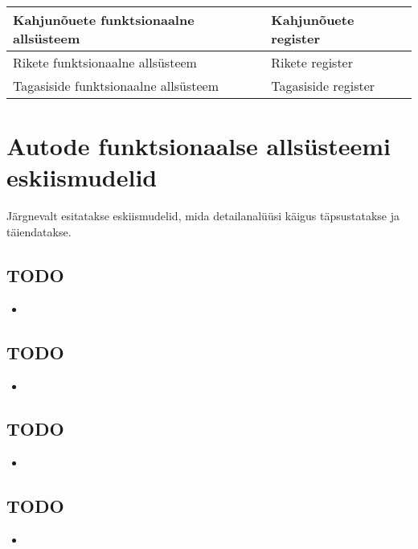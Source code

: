 \documentclass{report}
\begin{document}
\begin{table}[]
\begin{tabular}{|l|l|}
		Kahjunõuete funktsionaalne allsüsteem                                            & Kahjunõuete register                                                                                                                                    \\ \hline
		Rikete funktsionaalne allsüsteem                                                 & Rikete register                                                                                                                                         \\ \hline
		Tagasiside funktsionaalne allsüsteem                                             & Tagasiside register                                                                                                                                     \\ \hline
	\end{tabular}
\end{table}

 

 
 \section{Autode funktsionaalse allsüsteemi eskiismudelid}
Järgnevalt esitatakse eskiismudelid, mida detailanalüüsi käigus täpsustatakse ja täiendatakse.
 
 \subsection{TODO}
 \begin{itemize}
 	\item 
 \end{itemize}
 
   \subsection{TODO}
 \begin{itemize}
 	\item 
 \end{itemize}
 
 \subsection{TODO}
 \begin{itemize}
 	\item 
 \end{itemize}

 \subsection{TODO}
\begin{itemize}
	\item 
\end{itemize}
\end{document}
